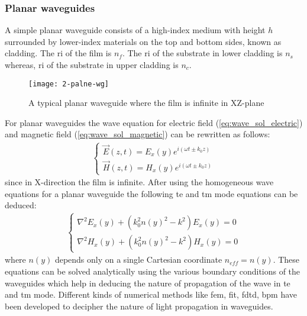 \documentclass[../report.tex]{subfiles}
\begin{document}
		\subsubsection{Planar waveguides}
A simple planar waveguide consists of a high-index medium with height $h$ surrounded by lower-index materials on the top and bottom sides, known as cladding. The \gls{ri} of the film is $n_f$. The \gls{ri} of the substrate in lower cladding is $n_s$ whereas, \gls{ri} of the substrate in upper cladding is $n_c$.
\begin{figure}[H]
	\centering
	\texttt{[image: 2-palne-wg]}
	\caption{A typical planar waveguide where the film is infinite in XZ-plane}
	\label{fig:2_palne_wg}
\end{figure}
For planar waveguides the wave equation for electric field (\ref{eq:wave_sol_electric}) and magnetic field (\ref{eq:wave_sol_magnetic}) can be rewritten as follows:
\begin{equation}\label{eq:wave_sol_planar_wg}
\begin{aligned}
\begin{cases}
\overrightarrow{E}(z,t)=E_{x}(y)e^{i\left(\omega t \pm k_{0}z\right)}\\
\overrightarrow{H}(z,t)=H_{x}(y)e^{i\left(\omega t \pm k_{0}z\right)}
\end{cases}
\end{aligned}
\end{equation}	
since in X-direction the film is infinite. After using the homogeneous wave equations for a planar waveguide the following \gls{te} and \gls{tm} mode equations can be deduced:
\begin{equation}\label{eq:homogeneous_wave_sol_planar_wg}
\begin{aligned}
\begin{cases}
\nabla^{2}E_x(y) + (k_{0}^{2}n(y)^{2}-k^{2}){E_{x}(y)} = 0\\
\nabla^{2}H_x(y) + (k_{0}^{2}n(y)^{2}-k^{2}){H_{x}(y)} = 0	
\end{cases}
\end{aligned}
\end{equation}
where $n(y)$ depends only on a single Cartesian coordinate $n_{eff} = n(y)$. These equations can be solved analytically using the various boundary conditions of the waveguides which help in deducing the nature of propagation of the wave in \gls{te} and \gls{tm} mode. Different kinds of numerical methods like \gls{fem}, \gls{fit}, \gls{fdtd}, \gls{bpm} have been developed to decipher the nature of light propagation in waveguides.
\end{document}
